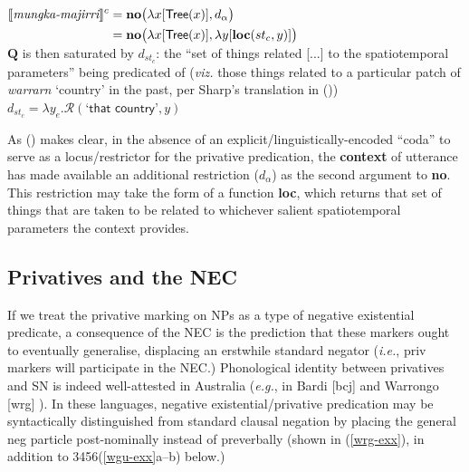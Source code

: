 $\begin{aligned}\denote[c]{\textit{mungka-majirri}}&=\textbf{no}\big(\lambda x[\textsf{Tree}(x)],d_\alpha\big)\\
&=\textbf{no}\big(\lambda x[\textsf{Tree}(x)],\lambda y[\textbf{loc}(st_c,y)]\big)\\\end{aligned}$\\
$ \boldsymbol Q $ is then saturated by $ d_{st_c} $: the ``set of things related [...] to the spatiotemporal parameters'' being predicated of (\textit{viz.} those things related to a particular patch of \textit{warrarn} `country' in the past, per Sharp's translation in ()) \hfill $ d_{st_{c}}=\lambda y_e.\mathcal R(\textsf{`that country'},y)$

\xe

As () makes clear, in the absence of an explicit/linguistically-encoded ``coda'' to serve as a locus/restrictor for the privative predication, the \textbf{context} of utterance has made available an additional restriction ($ d_\alpha $) as the second argument to \textbf{no}. This restriction may take the form of a function \textbf{loc}, which returns that set of things that are taken to be related to whichever salient spatiotemporal parameters the context provides.


\subsection{Privatives and the \acrshort{NEC}}

If we treat the privative marking on NPs as a type of negative existential predicate, a consequence of the \acrshort{NEC} is the prediction that these markers ought to eventually generalise, displacing an erstwhile standard negator (\textit{i.e.}, \gls{priv}  markers will participate in the \acrshort{NEC}.) Phonological identity between privatives and SN is indeed well-attested in Australia (\textit{e.g.}, in Bardi [\gls{bcj}] \citep{Bowern2012} and Warrongo [\gls{wrg}] \citep{Tsunoda2011}). In these languages, negative existential/privative predication may be syntactically distinguished from standard clausal negation by placing the general \gls{neg} particle post-nominally instead of preverbally (shown in (\ref{wrg-exx}), in addition to 3456(\ref{wgu-exx}a--b) below.)

